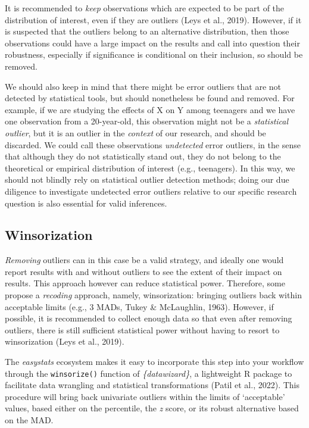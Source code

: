 \documentclass{article}
\begin{document}
It is recommended to \emph{keep} observations which are expected to be
part of the distribution of interest, even if they are outliers (Leys et
al., 2019). However, if it is suspected that the outliers belong to an
alternative distribution, then those observations could have a large
impact on the results and call into question their robustness,
especially if significance is conditional on their inclusion, so should
be removed.

We should also keep in mind that there might be error outliers that are
not detected by statistical tools, but should nonetheless be found and
removed. For example, if we are studying the effects of X on Y among
teenagers and we have one observation from a 20-year-old, this
observation might not be a \emph{statistical outlier}, but it is an
outlier in the \emph{context} of our research, and should be discarded.
We could call these observations \emph{undetected} error outliers, in
the sense that although they do not statistically stand out, they do not
belong to the theoretical or empirical distribution of interest (e.g.,
teenagers). In this way, we should not blindly rely on statistical
outlier detection methods; doing our due diligence to investigate
undetected error outliers relative to our specific research question is
also essential for valid inferences.

\hypertarget{winsorization}{%
\subsection{Winsorization}\label{winsorization}}

\emph{Removing} outliers can in this case be a valid strategy, and
ideally one would report results with and without outliers to see the
extent of their impact on results. This approach however can reduce
statistical power. Therefore, some propose a \emph{recoding} approach,
namely, winsorization: bringing outliers back within acceptable limits
(e.g., 3 MADs, Tukey \& McLaughlin, 1963). However, if possible, it is
recommended to collect enough data so that even after removing outliers,
there is still sufficient statistical power without having to resort to
winsorization (Leys et al., 2019).

The \emph{easystats} ecosystem makes it easy to incorporate this step
into your workflow through the \texttt{winsorize()} function of
\emph{\{datawizard\}}, a lightweight R package to facilitate data
wrangling and statistical transformations (Patil et al., 2022). This
procedure will bring back univariate outliers within the limits of
`acceptable' values, based either on the percentile, the \emph{z} score,
or its robust alternative based on the MAD.
\end{document}
